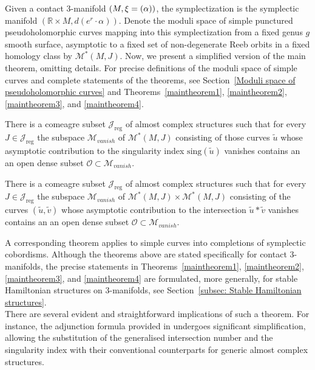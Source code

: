 \documentclass[11pt, a4paper]{amsart}
\newcommand{\cJ}{\mathcal{J}}
\newcommand{\cM}{\mathcal{M}}
\newcommand{\cO}{\mathcal{O}}
\let\ker\relax
\DeclareMathOperator{\ker}{Ker}
\begin{document}
Given a contact 3-manifold $(M,\xi=\ker(\alpha))$, the symplectization is the symplectic manifold $(\mathbb{R}\times M, d(e^r{\cdot}\alpha))$. Denote the moduli space of simple punctured pseudoholomorphic curves mapping into this symplectization from a fixed genus $g$ smooth surface, asymptotic to a fixed set of non-degenerate Reeb orbits in a fixed homology class by $\mathcal{M}^*(M,J)$. Now, we present a simplified version of the main theorem, omitting details. For precise definitions of the moduli space of simple curves and complete statements of the theorems, see Section~\ref{Moduli space of pseudoholomorphic curves} and Theorems~\ref{maintheorem1}, \ref{maintheorem2}, \ref{maintheorem3}, and \ref{maintheorem4}.

\begin{theorem}
There is a comeagre subset $\cJ_{\mathrm{reg}}$ of almost complex structures such that for every $J \in \cJ_{\mathrm{reg}}$ the subspace $\cM_{vanish}$ of $\cM^*(M,J)$ consisting of those curves $\tilde{u}$ whose asymptotic contribution to the singularity index $\mathrm{sing}(\tilde{u})$ vanishes contains an an open dense subset $\cO \subset \cM_{vanish}$.
\end{theorem}


\begin{theorem}
There is a comeagre subset $\cJ_{\mathrm{reg}}$ of almost complex structures such that for every $J \in \cJ_{\mathrm{reg}}$ the subspace $\cM_{vanish}$ of $\cM^*(M,J) \times \cM^*(M,J)$ consisting of the curves $(\tilde{u},\tilde{v})$ whose asymptotic contribution to the intersection $\tilde{u}*\tilde{v}$ vanishes contains an an open dense subset $\cO \subset \cM_{vanish}$.
\end{theorem} 

A corresponding theorem applies to simple curves into completions of symplectic cobordisms. Although the theorems above are stated specifically for contact 3-manifolds, the precise statements in Theorems~\ref{maintheorem1}, \ref{maintheorem2}, \ref{maintheorem3}, and \ref{maintheorem4} are formulated, more generally, for stable Hamiltonian structures on 3-manifolds, see Section~\ref{subsec: Stable Hamiltonian structures}.\\

There are several evident and straightforward implications of such a theorem. For instance, the adjunction formula provided in \cite[Theorem~4.6]{Siefinter2009} undergoes significant simplification, allowing the substitution of the generalised intersection number and the singularity index with their conventional counterparts for generic almost complex structures.\\
\end{document}
